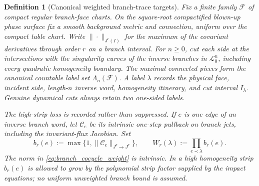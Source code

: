\documentclass[11pt]{amsart}
\theoremstyle{compactplain}
\theoremstyle{compactdefinition}
\newtheorem*{definition*}{Definition}
\theoremstyle{compactremark}
\newcommand{\Ltransfer}{\mathscr L}
\begin{document}
\begin{definition*}[Canonical weighted branch-trace targets]
Fix a finite family \(\mathscr F\) of compact regular branch-face charts.  On
the square-root compactified blown-up phase surface fix a smooth background metric and
connection, uniform over the compact table chart.  Write
\(\|\cdot\|_{J^r(I)}\) for the maximum of the covariant derivatives through
order \(r\) on a branch interval.  For \(n\ge0\), cut each side
at the intersections with the singularity curves of the inverse branches in
\(\Ltransfer_0^n\), including every quadratic homogeneity boundary.  The
maximal connected pieces form the canonical countable label set
\(\Lambda_n(\mathscr F)\).  A label \(\lambda\) records the physical face,
incident side, length-\(n\) inverse word, homogeneity itinerary, and cut
interval \(I_\lambda\).  Genuine dynamical cuts always retain two one-sided
labels.

The high-strip loss is recorded rather than suppressed.  If \(e\) is one edge
of an inverse branch word, let \(\mathcal C_e\) be its intrinsic one-step
pullback on branch jets, including the invariant-flux Jacobian.  Set
\begin{equation}
\label{eq:branch_cocycle_weight}
 b_r(e):=\max\{1,\|\mathcal C_e\|_{J^r\to J^r}\},
 \qquad
 W_r(\lambda):=\prod_{e\prec\lambda}b_r(e).
\end{equation}
The norm in \eqref{eq:branch_cocycle_weight} is intrinsic.  In a high
homogeneity strip \(b_r(e)\) is allowed to grow by the
polynomial strip factor supplied by the impact equations; no uniform
unweighted branch bound is assumed.


\end{definition*}
\end{document}
